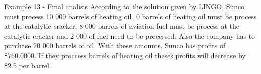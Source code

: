 \begin{frame}{Example 13 - Final analisis}
According to the solution given by LINGO, Sunco must process 10 000 barrels
of heating oil,  0 barrels of heating oil must be process at the catalytic cracker,
8 000 barrels of aviation fuel must be process at the catalytic cracker and 2 000
of fuel need to be processed. Also the company has to purchase 20 000 barrels
of oil. With these amounts, Sunco has profits of \$760.0000. If they proccess
barrels of heating oil theses profits will decrease by \$2.5 per barrel.
\end{frame}
